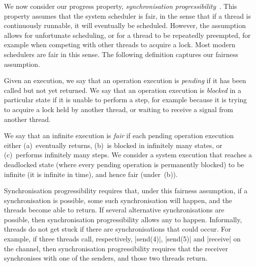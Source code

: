 



We now consider our progress property, \emph{synchronisation
  progressibility}~\cite{LL:synchronisation}.  This property assumes that the
system scheduler is fair, in the sense that if a thread is continuously
runnable, it will eventually be scheduled.  However, the assumption allows for
unfortunate scheduling, or for a thread to be repeatedly preempted, for
example when competing with other threads to acquire a lock.  Most modern
schedulers are fair in this sense.
The following definition captures our fairness assumption.
%
\begin{definition}
Given an execution, we say that an operation execution is \emph{pending} if it
has been called but not yet returned.  We say that an operation execution is
\emph{blocked} in a particular state if it is unable to perform a step, for
example because it is trying to acquire a lock held by another thread, or
waiting to receive a signal from another thread.

We say that an infinite execution is \emph{fair} if each pending operation
execution either (a)~eventually returns, (b)~is blocked in infinitely many
states, or (c)~performs infinitely many steps.  We consider a system execution
that reaches a deadlocked state (where every pending operation is permanently
blocked) to be infinite (it is infinite in time), and hence fair (under~(b)).
\end{definition}


Synchronisation progressibility requires that, under this fairness assumption,
if a synchronisation is possible, some such synchronisation will happen, and
the threads become able to return.  If several alternative synchronisations
are possible, then synchronisation progressibility allows any to happen.
Informally, threads do not get stuck if there are synchronisations that could
occur.  For example, if three threads call, respectively, |send(4)|, |send(5)|
and |receive| on the channel, then synchronisation progressibility requires
that the receiver synchronises with one of the senders, and those two threads
return.


